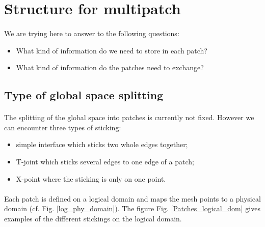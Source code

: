 \documentclass[presentation.tex]{subfiles}
\begin{document}
\maketitle


\section{Structure for multipatch}
\paragraph{}
We are trying here to answer to the following questions: 
\begin{itemize}
	\item What kind of information do we need to store in each patch? 
	\item What kind of information do the patches need to exchange? 
\end{itemize}


\subsection{Type of global space splitting}
\paragraph{}
The splitting of the global space into patches is currently not fixed. However we can encounter three types of sticking: 
\begin{itemize}
	\item simple interface which sticks two whole edges together; 
	\item T-joint which sticks several edges to one edge of a patch; 
	\item X-point where the sticking is only on one point. 
\end{itemize}

\paragraph{}
Each patch is defined on a logical domain and maps the mesh points to a physical domain (cf. Fig. \ref{log_phy_domain}). 
The figure Fig. \ref{Patches_logical_dom} gives examples of the different stickings on the logical domain. 
\end{document}

